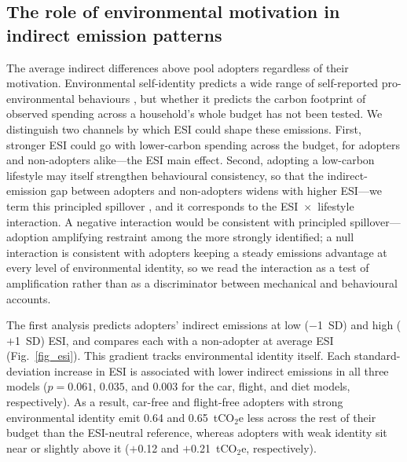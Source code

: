 \documentclass[sn-nature]{sn-jnl}
\begin{document}
\subsection{The role of environmental motivation in indirect emission patterns}
The average indirect differences above pool adopters regardless of their motivation. Environmental self-identity predicts a wide range of self-reported pro-environmental behaviours \citep{VanDerWerff2013,WhitmarshONeill2010}, but whether it predicts the carbon footprint of observed spending across a household's whole budget has not been tested. We distinguish two channels by which ESI could shape these emissions. First, stronger ESI could go with lower-carbon spending across the budget, for adopters and non-adopters alike---the ESI main effect. Second, adopting a low-carbon lifestyle may itself strengthen behavioural consistency, so that the indirect-emission gap between adopters and non-adopters widens with higher ESI---we term this principled spillover \citep{Truelove2014}, and it corresponds to the ESI~$\times$~lifestyle interaction. A negative interaction would be consistent with principled spillover---adoption amplifying restraint among the more strongly identified; a null interaction is consistent with adopters keeping a steady emissions advantage at every level of environmental identity, so we read the interaction as a test of amplification rather than as a discriminator between mechanical and behavioural accounts.

The first analysis predicts adopters' indirect emissions at low ($-$1~SD) and high ($+$1~SD) ESI, and compares each with a non-adopter at average ESI (Fig.~\ref{fig_esi}). This gradient tracks environmental identity itself. Each standard-deviation increase in ESI is associated with lower indirect emissions in all three models ($p = 0.061$, $0.035$, and $0.003$ for the car, flight, and diet models, respectively). As a result, car-free and flight-free adopters with strong environmental identity emit 0.64 and 0.65~tCO$_2$e less across the rest of their budget than the ESI-neutral reference, whereas adopters with weak identity sit near or slightly above it ($+$0.12 and $+$0.21~tCO$_2$e, respectively).
\end{document}
